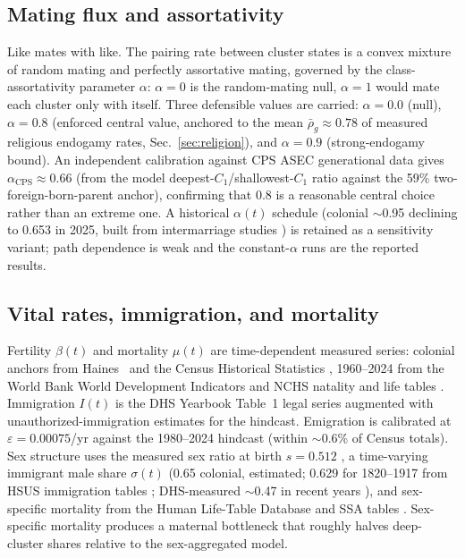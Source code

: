 \documentclass[11pt,a4paper]{article}
\begin{document}
\subsection{Mating flux and assortativity}
\label{sec:assort}
Like mates with like.  The pairing rate between cluster states is a
convex mixture of random mating and perfectly assortative mating,
governed by the class-assortativity parameter $\alpha$:
$\alpha=0$ is the random-mating null, $\alpha=1$ would mate each
cluster only with itself.  Three defensible values are carried:
$\alpha=0.0$ (null), $\alpha=0.8$ (enforced central value, anchored to
the mean $\bar\rho_g\approx0.78$ of measured religious endogamy rates,
Sec.~\ref{sec:religion}), and $\alpha=0.9$ (strong-endogamy bound).
An independent calibration against CPS ASEC generational data gives
$\alpha_{\mathrm{CPS}}\approx0.66$ \cite{cps-asec-2024,p23-214}
(from the model deepest-$C_1$/shallowest-$C_1$ ratio against the 59\%
two-foreign-born-parent anchor),
confirming that 0.8 is a reasonable central choice rather than an
extreme one.  A historical $\alpha(t)$ schedule (colonial $\sim$0.95
declining to 0.653 in 2025, built from intermarriage studies
\cite{pew-intermarriage-2023,livingston-brown-2017,pagnini-morgan-1990,
draschler-1921,logan-shin-2012,alba-golden-1986,alba-1983,spoerlein-2014})
is retained as a sensitivity variant; path dependence is weak and the
constant-$\alpha$ runs are the reported results.

\subsection{Vital rates, immigration, and mortality}
\label{sec:rates}
Fertility $\beta(t)$ and mortality $\mu(t)$ are time-dependent measured
series: colonial anchors from Haines~\cite{haines} and the Census
Historical Statistics \cite{census-hsus}, 1960--2024 from the World
Bank World Development Indicators \cite{wdi} and NCHS natality and life
tables \cite{nchs-natality,nchs-lifetables}.  Immigration $I(t)$ is the
DHS Yearbook Table~1 legal series \cite{dhs-yearbook} augmented with
unauthorized-immigration estimates \cite{dhs-unauth} for the hindcast.
Emigration is calibrated at $\varepsilon=0.00075$/yr against the
1980--2024 hindcast (within $\sim$0.6\% of Census totals).
Sex structure uses the measured sex ratio at birth $s=0.512$
\cite{nchs-natality}, a time-varying immigrant male share $\sigma(t)$
(0.65 colonial, estimated; 0.629 for 1820--1917 from HSUS immigration
tables \cite{hsus-immig}; DHS-measured $\sim$0.47 in recent years
\cite{dhs-lpr-sex,dhs-unauth-table4}), and sex-specific mortality from
the Human Life-Table Database and SSA tables
\cite{hld,bell-miller}.  Sex-specific mortality produces a maternal
bottleneck that roughly halves deep-cluster shares relative to the
sex-aggregated model.
\end{document}
